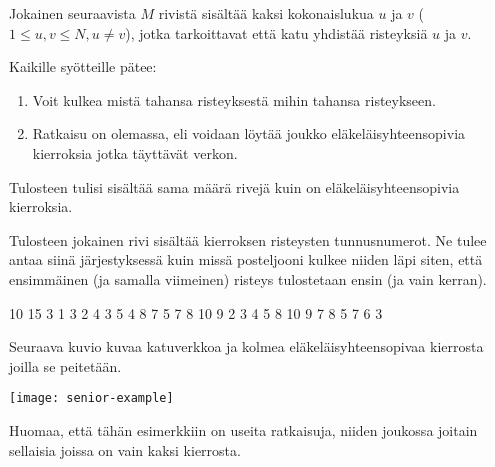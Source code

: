\documentclass{boi2014-fi}
\begin{document}
    Jokainen seuraavista $M$ rivistä sisältää kaksi kokonaislukua $u$ ja $v$
    ($1 \le u, v \le N, u \neq v$), jotka tarkoittavat että katu yhdistää
    risteyksiä $u$ ja $v$.

    Kaikille syötteille pätee:
    \begin{enumerate}
        \item Voit kulkea mistä tahansa risteyksestä mihin tahansa risteykseen.
        \item Ratkaisu on olemassa, eli voidaan löytää joukko eläkeläisyhteensopivia
            kierroksia jotka täyttävät verkon.
    \end{enumerate}
    
    \Output
    Tulosteen tulisi sisältää sama määrä rivejä kuin on eläkeläisyhteensopivia
    kierroksia.
    
    Tulosteen jokainen rivi sisältää kierroksen risteysten tunnusnumerot. Ne
    tulee antaa siinä järjestyksessä kuin missä posteljooni kulkee niiden
    läpi siten, että ensimmäinen (ja samalla viimeinen) risteys tulostetaan ensin
    (ja vain kerran).

    \Example

    \example
    {
        10 15  3  1 3  2 4  3 5  4 8  7  5 7  8  10  9
    }
    {
        2 3 4 5 8 10 9  7 8  5 7 6 3
    }
    {
        Seuraava kuvio kuvaa katuverkkoa ja kolmea eläkeläisyhteensopivaa
        kierrosta joilla se peitetään.

        \texttt{[image: senior-example]}

        Huomaa, että tähän esimerkkiin on useita ratkaisuja, niiden joukossa
        joitain sellaisia joissa on vain kaksi kierrosta.
    }
\end{document}
